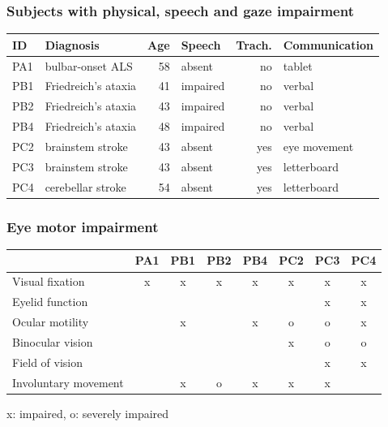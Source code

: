 \documentclass{kul-ulille-beamer}
\begin{document}
\begin{frame}
  \frametitle{Subjects with physical, speech and gaze impairment}

  \begin{tabular}{@{}l|lrlrl@{}}
      \textbf{ID}  & \textbf{Diagnosis} & \textbf{Age} &
      \textbf{Speech} & \textbf{Trach.} & \textbf{Communication} \\ \hline
      PA1 & bulbar-onset ALS & 58  & absent  & no          & tablet                 \\
      PB1 & Friedreich's ataxia & 41  & impaired & no          & verbal                 \\
      PB2 & Friedreich's ataxia & 43  & impaired & no          & verbal                 \\
      PB4 & Friedreich's ataxia & 48  & impaired & no          & verbal                 \\
      PC2 & brainstem stroke & 43  & absent  & yes         &  eye movement \\
      PC3 & brainstem stroke & 43  & absent  & yes         & letterboard            \\
      PC4 & cerebellar stroke & 54  & absent  & yes         & letterboard \\
  \end{tabular}

\end{frame}



\begin{frame}
  \frametitle{Eye motor impairment}
  \newcommand{\skill}{}
  \newcommand{\noskill}{x}
  \newcommand{\snoskill}{o}

  \begin{tabular}{l|ccccccc}
                            & PA1      & PB1      & PB2       & PB4      & PC2       & PC3       & PC4 \\ \hline
    \small Visual fixation         & \noskill & \noskill & \noskill  & \noskill & \noskill  & \noskill  & \noskill \\
    \small Eyelid function         & \skill   & \skill   & \skill    & \skill   &  \skill  & \noskill  & \noskill \\
    \small Ocular motility         & \skill   & \noskill & \skill    & \noskill & \snoskill & \snoskill & \noskill\\
    \small Binocular vision        & \skill   & \skill   & \skill    & \skill   & \noskill  & \snoskill & \snoskill \\
    \small Field of vision         & \skill   & \skill   & \skill    & \skill   & \skill    & \noskill  & \noskill \\
    \small Involuntary movement    & \skill   & \noskill & \snoskill  & \noskill &  \noskill  & \noskill  & \skill \\
  \end{tabular}
  \bigskip

  x: impaired, o: severely impaired
\end{frame}
\end{document}
